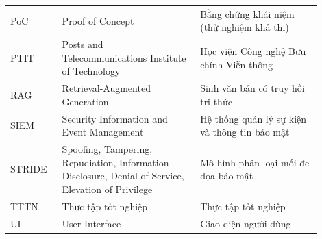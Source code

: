 \begin{longtable}{p{0.15\linewidth} >{\raggedright\arraybackslash}p{0.4\linewidth} >{\raggedright\arraybackslash}p{0.35\linewidth}}
\addlinespace
PoC & Proof of Concept & Bằng chứng khái niệm (thử nghiệm khả thi) \\
\addlinespace
PTIT & Posts and Telecommunications Institute of Technology & Học viện Công nghệ Bưu chính Viễn thông \\
\addlinespace
RAG & Retrieval-Augmented Generation & Sinh văn bản có truy hồi tri thức \\
\addlinespace
SIEM & Security Information and Event Management & Hệ thống quản lý sự kiện và thông tin bảo mật \\
\addlinespace
STRIDE & Spoofing, Tampering, Repudiation, Information Disclosure, Denial of Service, Elevation of Privilege & Mô hình phân loại mối đe dọa bảo mật \\
\addlinespace
TTTN & Thực tập tốt nghiệp & Thực tập tốt nghiệp \\
\addlinespace
UI & User Interface & Giao diện người dùng \\

\end{longtable}
